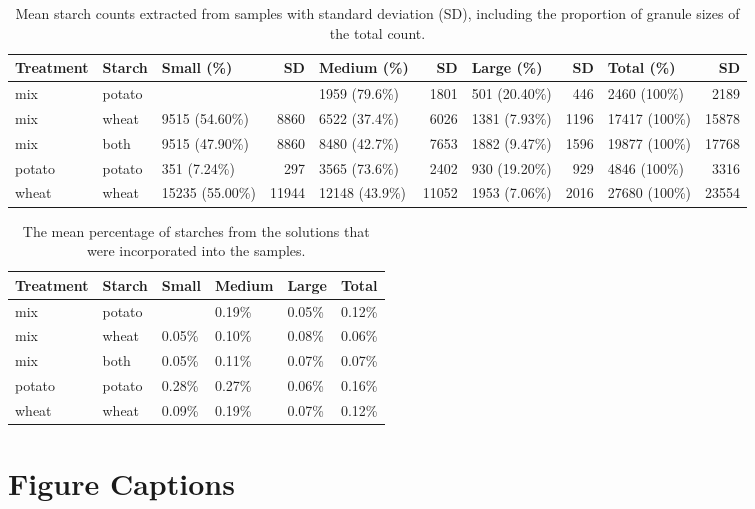 \documentclass[utf8]{frontiers/frontiersSCNS}
\begin{document}
\begin{table}

\caption{\label{tab:sample-count-tbl}Mean starch counts extracted from samples with standard 
             deviation (SD), including the proportion of granule sizes of the total count.}
\centering
\begin{tabular}[t]{l|l|l|r|l|r|l|r|l|r}
\hline
Treatment & Starch & Small (\%) & SD & Medium (\%) & SD & Large (\%) & SD & Total (\%) & SD\\
\hline
mix & potato &  &  & 1959 (79.6\%) & 1801 & 501 (20.40\%) & 446 & 2460 (100\%) & 2189\\
\hline
mix & wheat & 9515 (54.60\%) & 8860 & 6522 (37.4\%) & 6026 & 1381 (7.93\%) & 1196 & 17417 (100\%) & 15878\\
\hline
mix & both & 9515 (47.90\%) & 8860 & 8480 (42.7\%) & 7653 & 1882 (9.47\%) & 1596 & 19877 (100\%) & 17768\\
\hline
potato & potato & 351 (7.24\%) & 297 & 3565 (73.6\%) & 2402 & 930 (19.20\%) & 929 & 4846 (100\%) & 3316\\
\hline
wheat & wheat & 15235 (55.00\%) & 11944 & 12148 (43.9\%) & 11052 & 1953 (7.06\%) & 2016 & 27680 (100\%) & 23554\\
\hline
\end{tabular}
\end{table}

\begin{table}

\caption{\label{tab:sample-prop-tbl}The mean percentage of starches from the solutions that 
              were incorporated into the samples.}
\centering
\begin{tabular}[t]{l|l|l|l|l|l}
\hline
Treatment & Starch & Small & Medium & Large & Total\\
\hline
mix & potato &  & 0.19\% & 0.05\% & 0.12\%\\
\hline
mix & wheat & 0.05\% & 0.10\% & 0.08\% & 0.06\%\\
\hline
mix & both & 0.05\% & 0.11\% & 0.07\% & 0.07\%\\
\hline
potato & potato & 0.28\% & 0.27\% & 0.06\% & 0.16\%\\
\hline
wheat & wheat & 0.09\% & 0.19\% & 0.07\% & 0.12\%\\
\hline
\end{tabular}
\end{table}

\hypertarget{figure-captions}{%
\section{Figure Captions}\label{figure-captions}}
\end{document}
